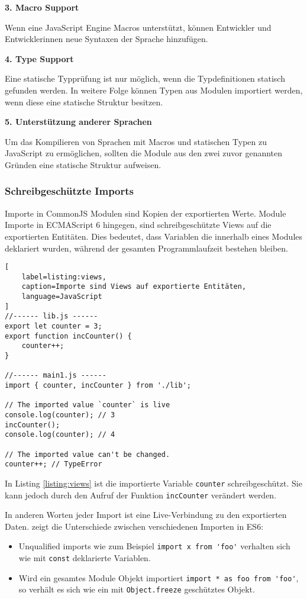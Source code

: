\bigskip

\textbf{3. Macro Support}

Wenn eine JavaScript Engine Macros unterstützt, können Entwickler und Entwicklerinnen neue Syntaxen der Sprache hinzufügen.

\bigskip

\textbf{4. Type Support}

Eine statische Typprüfung ist nur möglich, wenn die Typdefinitionen statisch gefunden werden. In weitere Folge können Typen aus Modulen importiert werden, wenn diese eine statische Struktur besitzen.

\bigskip

\textbf{5. Unterstützung anderer Sprachen}

Um das Kompilieren von Sprachen mit Macros und statischen Typen zu JavaScript zu ermöglichen, sollten die Module aus den zwei zuvor genannten Gründen eine statische Struktur aufweisen.

\subsubsection{Schreibgeschützte Imports}
\label{subsubsection:importes}

Importe in CommonJS Modulen sind Kopien der exportierten Werte. Module Importe in ECMAScript 6 hingegen, sind schreibgeschützte Views auf die exportierten Entitäten. Dies bedeutet, dass Variablen die innerhalb eines Modules deklariert wurden, während der gesamten Programmlaufzeit bestehen bleiben. \autocite{Rauschmayer2018}


\begin{lstlisting}[
    label=listing:views,
    caption=Importe sind Views auf exportierte Entitäten,
	language=JavaScript
]
//------ lib.js ------
export let counter = 3;
export function incCounter() {
    counter++;
}

//------ main1.js ------
import { counter, incCounter } from './lib';

// The imported value `counter` is live
console.log(counter); // 3
incCounter();
console.log(counter); // 4

// The imported value can't be changed.
counter++; // TypeError
\end{lstlisting}

In Listing \ref{listing:views} ist die importierte Variable \lstinline{counter} schreibgeschützt. Sie kann jedoch durch den Aufruf der Funktion  \lstinline{incCounter} verändert werden.

In anderen Worten jeder Import ist eine Live-Verbindung zu den exportierten Daten. \textcite{Rauschmayer2018} zeigt die Unterschiede zwischen verschiedenen Importen in ES6:
\begin{itemize}
\item Unqualified imports wie zum Beispiel \lstinline{import x from 'foo'} verhalten sich wie mit \lstinline{const} deklarierte Variablen.
\item Wird ein gesamtes Module Objekt importiert \lstinline{import * as foo from 'foo'}, so verhält es sich wie ein mit \lstinline{Object.freeze} geschütztes Objekt.
\end{itemize}

